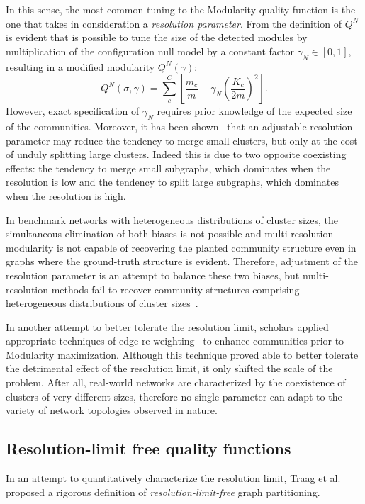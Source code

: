 In this sense, the most common tuning to the Modularity quality function is the one that takes in consideration a \emph{resolution parameter}.
From the definition of $Q^N$ is evident that is possible to tune the size of the detected modules by multiplication of the configuration null model by a constant factor $\gamma_{N} \in [0,1]$, resulting in a modified modularity $Q^N(\gamma)$:
\begin{equation}
Q^N(\sigma,\gamma) = \sum_c^C \left[ \frac{m_c}{m} - \gamma_{N} \left( \frac{K_c}{2m}\right)^2 \right].
\end{equation}
However, exact specification of $\gamma_{N}$ requires prior knowledge of the expected size of the communities.
Moreover, it has been shown~\cite{lancichinetti2011} that an adjustable resolution parameter may reduce the tendency to merge small clusters, but only at the cost of unduly splitting large clusters. 
Indeed this is due to two opposite coexisting effects: the tendency to merge small subgraphs, which dominates when the resolution is low and the tendency to split large subgraphs, which dominates when the resolution is high.

In benchmark networks with heterogeneous distributions of cluster sizes, the simultaneous elimination of both biases is not possible and multi-resolution modularity is not capable of recovering the planted community structure even in graphs where the ground-truth structure is evident.
Therefore, adjustment of the resolution parameter is an attempt to balance these two biases, but multi-resolution methods fail to recover community structures comprising heterogeneous distributions of cluster sizes~\cite{lancichinetti2011}. 

In another attempt to better tolerate the resolution limit, scholars applied appropriate techniques of edge re-weighting~\cite{berry2011} to enhance communities prior to Modularity maximization.
Although this technique proved able to better tolerate the detrimental effect of the resolution limit, it only shifted the scale of the problem.
After all, real-world networks are characterized by the coexistence of clusters of very different sizes, therefore no single parameter can adapt to the variety of network topologies observed in nature.

\subsection{Resolution-limit free quality functions}\label{sec:resolution_limit_free_quality_functions}
In an attempt to quantitatively characterize the resolution limit, Traag et al.~\cite{traag2011} proposed a rigorous definition of \emph{resolution-limit-free} graph partitioning.

